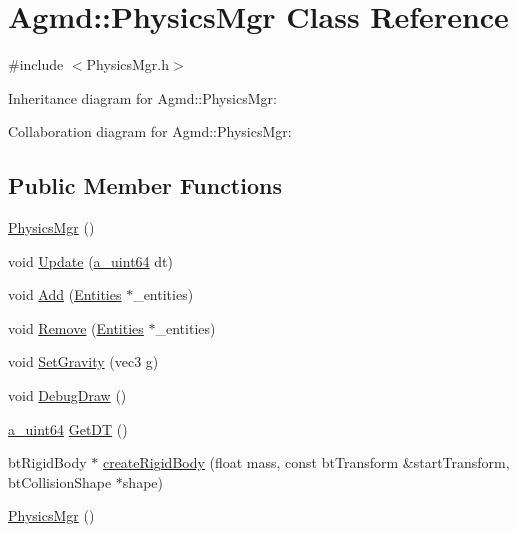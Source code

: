 \hypertarget{class_agmd_1_1_physics_mgr}{\section{Agmd\+:\+:Physics\+Mgr Class Reference}
\label{class_agmd_1_1_physics_mgr}
}


{\ttfamily \#include $<$Physics\+Mgr.\+h$>$}



Inheritance diagram for Agmd\+:\+:Physics\+Mgr\+:


Collaboration diagram for Agmd\+:\+:Physics\+Mgr\+:
\subsection*{Public Member Functions}
\begin{DoxyCompactItemize}
\item 
\hyperlink{class_agmd_1_1_physics_mgr_a865b1468ecb44d77f18d5463abe5f1c5}{Physics\+Mgr} ()
\item 
void \hyperlink{class_agmd_1_1_physics_mgr_af55b10a59198035e790c1713c8ebab3d}{Update} (\hyperlink{_common_defines_8h_a6c5192ec3c55d6e5b13d2dbaa082bdea}{a\+\_\+uint64} dt)
\item 
void \hyperlink{class_agmd_1_1_physics_mgr_aff2bd4dfab3960c274d71fce7b4f17c4}{Add} (\hyperlink{class_agmd_1_1_entities}{Entities} $\ast$\+\_\+entities)
\item 
void \hyperlink{class_agmd_1_1_physics_mgr_a56b400f17d6ac3c401f7b72ef9f086ac}{Remove} (\hyperlink{class_agmd_1_1_entities}{Entities} $\ast$\+\_\+entities)
\item 
void \hyperlink{class_agmd_1_1_physics_mgr_ac7c84371d878852c80af08b7fccd8cb1}{Set\+Gravity} (vec3 \hyperlink{_examples_2_planet_2_app_8cpp_a8cf17d727651616de6f2b79ef32170cd}{g})
\item 
void \hyperlink{class_agmd_1_1_physics_mgr_ac8096f3ccbac923cde88f6160b71b060}{Debug\+Draw} ()
\item 
\hyperlink{_common_defines_8h_a6c5192ec3c55d6e5b13d2dbaa082bdea}{a\+\_\+uint64} \hyperlink{class_agmd_1_1_physics_mgr_a343aba49763502d0ea4d6e4fcef3f52d}{Get\+D\+T} ()
\item 
bt\+Rigid\+Body $\ast$ \hyperlink{class_agmd_1_1_physics_mgr_aff67b70a599ce21b253095cc60644a3d}{create\+Rigid\+Body} (float mass, const bt\+Transform \&start\+Transform, bt\+Collision\+Shape $\ast$shape)
\item 
\hyperlink{class_agmd_1_1_physics_mgr_a865b1468ecb44d77f18d5463abe5f1c5}{Physics\+Mgr} ()

\end{DoxyCompactItemize}
